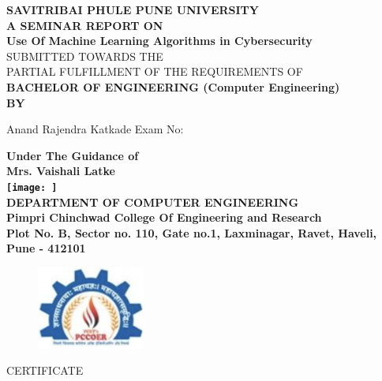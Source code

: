 \documentclass[oneside,a4paper,12pt]{report}
\begin{document}
\begin{titlepage}
\begin{center}
{\bfseries SAVITRIBAI PHULE PUNE UNIVERSITY \\}
\vspace*{1\baselineskip}
{\bfseries A SEMINAR REPORT ON \\}
\vspace*{1\baselineskip}
{\bfseries \fontsize{14}{17} \selectfont Use Of Machine Learning Algorithms in Cybersecurity\\ \vspace*{2\baselineskip}}
{\fontsize{12}{14} \selectfont SUBMITTED TOWARDS THE
 \\PARTIAL FULFILLMENT OF THE REQUIREMENTS OF \\

\vspace*{2\baselineskip}}
{\bfseries \fontsize{14}{17} \selectfont\hspace{13mm} BACHELOR OF ENGINEERING 
\newline (Computer Engineering) \\
\vspace*{1\baselineskip}} 
{\bfseries \fontsize{14}{17} \selectfont BY \\ 
\vspace*{1\baselineskip}} 
\bfseries
\begin{flushleft}
Anand Rajendra Katkade\hspace{40mm} Exam No: 
\end{flushleft}
\vspace*{2\baselineskip}
{\bfseries \fontsize{14}{17} \selectfont Under The Guidance of \\   
Mrs. Vaishali Latke\\
\vspace{1\baselineskip}
\texttt{[image: ]} \\
\vspace*{1\baselineskip} 
{\bfseries \fontsize{14}{17} \selectfont DEPARTMENT OF COMPUTER ENGINEERING \\ 
{\bfseries \fontsize{14}{17} \selectfont Pimpri Chinchwad College Of Engineering and Research \\ 
Plot No. B, Sector no. 110, Gate no.1, Laxminagar, Ravet, Haveli, Pune - 412101 
}}}
\end{center}
\end{titlepage}


\begin{figure}[H]
    \centering
    \includegraphics[width=100pt]{Screenshot 2024-09-25 120327.png} \\
\end{figure}
{\bfseries \fontsize{16}{12} \selectfont \centerline{CERTIFICATE} 
\vspace*{3\baselineskip}} 
\end{document}

